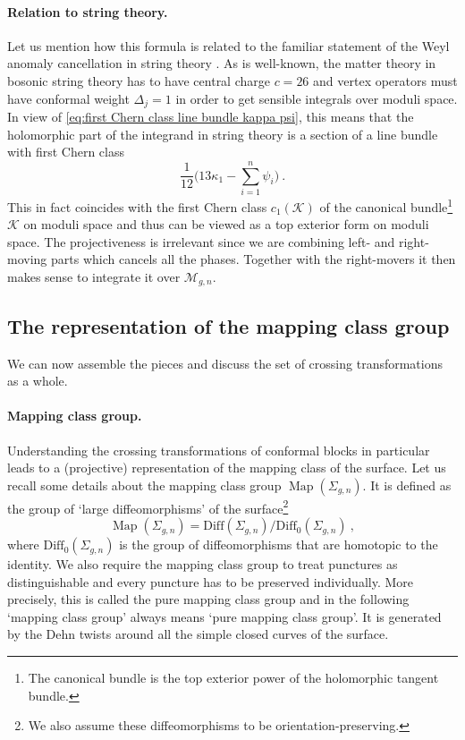 \documentclass[12pt,a4paper]{article}
\newcommand{\be}{\begin{equation}}
\newcommand{\ee}{\end{equation}}
\newcommand\Diff{\text{Diff}}
\DeclareMathOperator\Map{Map}
\begin{document}
\paragraph{Relation to string theory.} Let us mention how this formula is related to the familiar statement of the Weyl anomaly cancellation in string theory \cite{Polyakov:1981rd}. As is well-known, the matter theory in bosonic string theory has to have central charge $c=26$ and vertex operators must have conformal weight $\Delta_j=1$ in order to get sensible integrals over moduli space. In view of \eqref{eq:first Chern class line bundle kappa psi}, this means that the holomorphic part of the integrand in string theory is a section of a line bundle with first Chern class
\be 
\frac{1}{12}\bigg(13\kappa_1-\sum_{i=1}^n \psi_i \bigg)\ .
\ee
This in fact coincides with the first Chern class $c_1(\mathscr{K})$ of the canonical bundle\footnote{The canonical bundle is the top exterior power of the holomorphic tangent bundle.} $\mathscr{K}$ on moduli space \cite{HarrisMumford} and thus can be viewed as a top exterior form on moduli space. The projectiveness is irrelevant since we are combining left- and right-moving parts which cancels all the phases. Together with the right-movers it then makes sense to integrate it over $\mathcal{M}_{g,n}$.

\subsection{The representation of the mapping class group} \label{subsec:representation mapping class group}
We can now assemble the pieces and discuss the set of crossing transformations as a whole.



\paragraph{Mapping class group.} Understanding the crossing transformations of conformal blocks in particular leads to a (projective) representation of the mapping class of the surface. Let us recall some details about the mapping class group $\Map(\Sigma_{g,n})$. It is defined as the group of `large diffeomorphisms' of the surface\footnote{We also assume these diffeomorphisms to be orientation-preserving.}
\be 
\Map(\Sigma_{g,n})=\Diff(\Sigma_{g,n})/\Diff_0(\Sigma_{g,n})\ ,
\ee
where $\Diff_0(\Sigma_{g,n})$ is the group of diffeomorphisms that are homotopic to the identity. We also require the mapping class group to treat punctures as distinguishable and every puncture has to be preserved individually. More precisely, this is called the pure mapping class group and in the following `mapping class group' always means `pure mapping class group'.
It is generated by the Dehn twists around all the simple closed curves of the surface.
\end{document}
